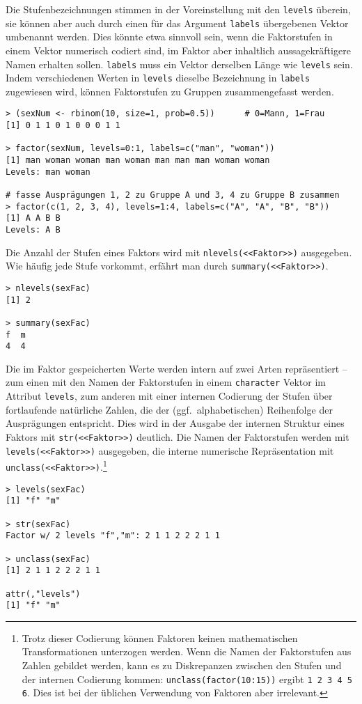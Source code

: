 Die Stufenbezeichnungen stimmen in der Voreinstellung mit den \lstinline!levels! überein, sie können aber auch durch einen für das Argument \lstinline!labels! übergebenen Vektor umbenannt werden. Dies könnte etwa sinnvoll sein, wenn die Faktorstufen in einem Vektor numerisch codiert sind, im Faktor aber inhaltlich aussagekräftigere Namen erhalten sollen. \lstinline!labels! muss ein Vektor derselben Länge wie \lstinline!levels! sein. Indem verschiedenen Werten in \lstinline!levels! dieselbe Bezeichnung in \lstinline!labels! zugewiesen wird, können Faktorstufen zu Gruppen zusammengefasst werden.
\begin{lstlisting}
> (sexNum <- rbinom(10, size=1, prob=0.5))      # 0=Mann, 1=Frau
[1] 0 1 1 0 1 0 0 0 1 1

> factor(sexNum, levels=0:1, labels=c("man", "woman"))
[1] man woman woman man woman man man man woman woman
Levels: man woman

# fasse Ausprägungen 1, 2 zu Gruppe A und 3, 4 zu Gruppe B zusammen
> factor(c(1, 2, 3, 4), levels=1:4, labels=c("A", "A", "B", "B"))
[1] A A B B
Levels: A B
\end{lstlisting}

Die Anzahl der Stufen eines Faktors wird mit \lstinline!nlevels(<<Faktor>>)! ausgegeben. Wie häufig jede Stufe vorkommt, erfährt man durch \lstinline!summary(<<Faktor>>)!.
\begin{lstlisting}
> nlevels(sexFac)
[1] 2

> summary(sexFac)
f  m
4  4
\end{lstlisting}

Die im Faktor gespeicherten Werte werden intern auf zwei Arten repräsentiert -- zum einen mit den Namen der Faktorstufen in einem \lstinline!character! Vektor im Attribut \lstinline!levels!, zum anderen mit einer internen Codierung der Stufen über fortlaufende natürliche Zahlen, die der (ggf.\ alphabetischen) Reihenfolge der Ausprägungen entspricht. Dies wird in der Ausgabe der internen Struktur eines Faktors mit \lstinline!str(<<Faktor>>)! deutlich. Die Namen der Faktorstufen werden mit \lstinline!levels(<<Faktor>>)! ausgegeben, die interne numerische Repräsentation mit \lstinline!unclass(<<Faktor>>)!.\footnote{Trotz dieser Codierung können Faktoren keinen mathematischen Transformationen unterzogen werden. Wenn die Namen der Faktorstufen aus Zahlen gebildet werden, kann es zu Diskrepanzen zwischen den Stufen und der internen Codierung kommen: \lstinline!unclass(factor(10:15))! ergibt \lstinline!1 2 3 4 5 6!. Dies ist bei der üblichen Verwendung von Faktoren aber irrelevant.}
\begin{lstlisting}
> levels(sexFac)
[1] "f" "m"

> str(sexFac)
Factor w/ 2 levels "f","m": 2 1 1 2 2 2 1 1

> unclass(sexFac)
[1] 2 1 1 2 2 2 1 1

attr(,"levels")
[1] "f" "m"
\end{lstlisting}

